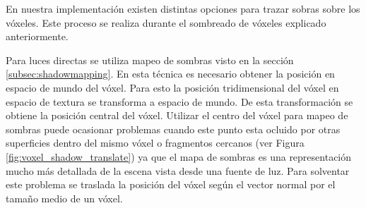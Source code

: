 En nuestra implementación existen distintas opciones para trazar sobras sobre los vóxeles. Este proceso se realiza durante el sombreado de vóxeles explicado anteriormente. 

Para luces directas se utiliza mapeo de sombras visto en la sección \ref{subsec:shadowmapping}. En esta técnica es necesario obtener la posición en espacio de mundo del vóxel. Para esto la posición tridimensional del vóxel en espacio de textura se transforma a espacio de mundo. De esta transformación se obtiene la posición central del vóxel. Utilizar el centro del vóxel para mapeo de sombras puede ocasionar problemas cuando este punto esta ocluido por otras superficies dentro del mismo vóxel o fragmentos cercanos (ver Figura \ref{fig:voxel_shadow_translate}) ya que el mapa de sombras es una representación mucho más detallada de la escena vista desde una fuente de luz. Para solventar este problema se traslada la posición del vóxel según el vector normal por el tamaño medio de un vóxel.

